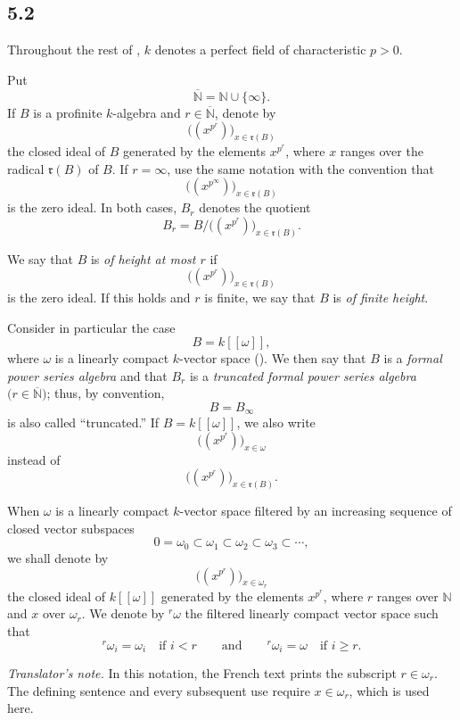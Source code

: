 
\subsection*{5.2}
\label{sga3:VIIB:5.2}

Throughout the rest of , \(k\) denotes a perfect field
of characteristic \(p>0\).

Put
\[
  \overline{\mathbb N}=\mathbb N\cup\{\infty\}.
\]
If \(B\) is a profinite \(k\)-algebra and
\(r\in\overline{\mathbb N}\), denote by
\[
  \bigl((x^{p^r})\bigr)_{x\in\mathfrak r(B)}
\]
the closed ideal of \(B\) generated by the elements \(x^{p^r}\),
where \(x\) ranges over the radical \(\mathfrak r(B)\) of \(B\).
If \(r=\infty\), use the same notation with the convention that
\[
  \bigl((x^{p^\infty})\bigr)_{x\in\mathfrak r(B)}
\]
is the zero ideal. In both cases, \(B_r\) denotes the quotient
\[
  B_r
  =
  B\big/\bigl((x^{p^r})\bigr)_{x\in\mathfrak r(B)}.
\]

We say that \(B\) is \emph{of height at most \(r\)} if
\[
  \bigl((x^{p^r})\bigr)_{x\in\mathfrak r(B)}
\]
is the zero ideal. If this holds and \(r\) is finite, we say that
\(B\) is \emph{of finite height}.

Consider in particular the case
\[
  B=k[[\omega]],
\]
where \(\omega\) is a linearly compact \(k\)-vector space
\textup{()}.
We then say that \(B\) is a \emph{formal power series algebra}
and that \(B_r\) is a \emph{truncated formal power series algebra}
\(\bigl(r\in\overline{\mathbb N}\bigr)\); thus, by convention,
\[
  B=B_\infty
\]
is also called ``truncated.'' If \(B=k[[\omega]]\), we also write
\[
  \bigl((x^{p^r})\bigr)_{x\in\omega}
\]
instead of
\[
  \bigl((x^{p^r})\bigr)_{x\in\mathfrak r(B)}.
\]

When \(\omega\) is a linearly compact \(k\)-vector space filtered by an
increasing sequence of closed vector subspaces
\[
  0=\omega_0\subset\omega_1\subset\omega_2
  \subset\omega_3\subset\cdots,
\]
we shall denote by
\[
  \bigl((x^{p^r})\bigr)_{x\in\omega_r}
\]
the closed ideal of \(k[[\omega]]\) generated by the elements
\(x^{p^r}\), where \(r\) ranges over \(\mathbb N\) and \(x\) over
\(\omega_r\). We denote by \({}^r\omega\) the filtered linearly compact
vector space such that
\[
  {}^r\omega_i=\omega_i\quad\text{if }i<r
  \qquad\text{and}\qquad
  {}^r\omega_i=\omega\quad\text{if }i\geq r.
\]

\label{sga3:VIIB:5.2:notation-source-note}
\noindent\textit{Translator's note.}\enspace
In this notation, the French text prints the subscript
\(r\in\omega_r\). The defining sentence and every
subsequent use require \(x\in\omega_r\), which is used here.

